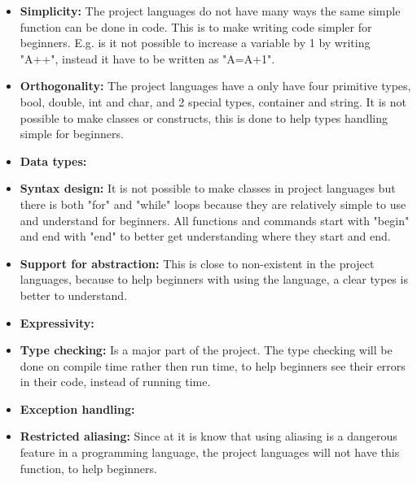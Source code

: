 \begin{itemize}
\item \textbf{Simplicity:} The project languages do not have many ways the same simple function can be done in code. This is to make writing code simpler for beginners.  E.g. is it not possible to increase a variable by 1 by writing "A++", instead it have to be written as "A=A+1".

\item \textbf{Orthogonality:} The project languages have a only have four primitive types, bool, double, int and char, and 2 special types, container and string. It is not possible to make classes or constructs, this is done to help types handling simple for beginners.

\item \textbf{Data types:} 

\item \textbf{Syntax design:} It is not possible to make classes in project languages but there is both "for" and "while" loops because they are relatively simple to use and understand for beginners. All functions and commands start with "begin" and end with "end" to better get understanding where they start and end.

\item \textbf{Support for abstraction:} This is close to non-existent in the project languages, because to help beginners with using the language, a clear types is better to understand.

\item \textbf{Expressivity:} 

\item \textbf{Type checking:} Is a major part of the project. The type checking will be done on compile time rather then run time, to help beginners see their errors in their code, instead of running time.

\item \textbf{Exception handling:} 

\item \textbf{Restricted aliasing:} Since at it is know that using aliasing is a dangerous feature in a programming language, the project languages will not have this function, to help beginners.
\end{itemize}
